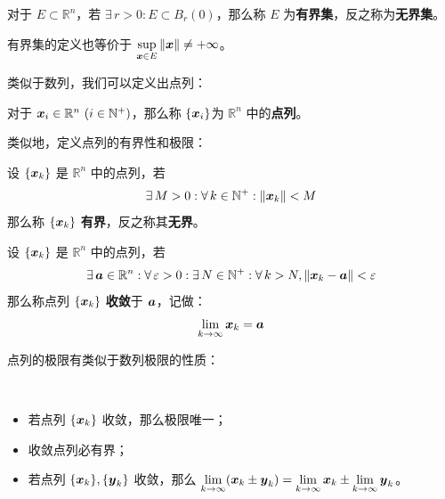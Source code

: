 \begin{definition}
    对于 $E \subset \mathbb{R}^{n}$，若 $\exists\,r > 0: E \subset B_r(0)$，那么称 $E$ 为\textbf{有界集}，反之称为\textbf{无界集}。
\end{definition}

\begin{remark}
    有界集的定义也等价于 $\sup\limits_{\boldsymbol{x} \in E} \norm{\boldsymbol{x}} \neq +\infty$。
\end{remark}

类似于数列，我们可以定义出点列：

\begin{definition}[点列]
    对于 $\boldsymbol{x}_i \in \mathbb{R}^{n} \ (i \in \mathbb{N}^{+})$，那么称 $\{\boldsymbol{x}_i\}$为 $\mathbb{R}^{n}$ 中的\textbf{点列}。
\end{definition}

类似地，定义点列的有界性和极限：

\begin{definition}[点列的有界性]
    设 $\{\boldsymbol{x}_k\}$ 是 $\mathbb{R}^{n}$ 中的点列，若
    $$
    \exists\,M > 0: \forall\,k \in \mathbb{N}^{+}: \norm{\boldsymbol{x}_k} < M
    $$
    那么称 $\{\boldsymbol{x}_k\}$ \textbf{有界}，反之称其\textbf{无界}。
\end{definition}

\begin{definition}[点列的极限]
    设 $\{\boldsymbol{x}_k\}$ 是 $\mathbb{R}^{n}$ 中的点列，若
    $$
    \exists\,\boldsymbol{a} \in \mathbb{R}^{n}: \forall\,\varepsilon > 0: \exists\,N \in \mathbb{N}^{+}: \forall\,k > N, \norm{\boldsymbol{x}_k - \boldsymbol{a}} < \varepsilon
    $$
    那么称点列 $\{\boldsymbol{x}_k\}$ \textbf{收敛}于 $\boldsymbol{a}$，记做：
    $$
    \lim_{k \to \infty} \boldsymbol{x}_k = \boldsymbol{a}
    $$
\end{definition}

点列的极限有类似于数列极限的性质：

\begin{property}
    \ 
    \begin{itemize}
        \item 若点列 $\{\boldsymbol{x}_k\}$ 收敛，那么极限唯一；
        \item 收敛点列必有界；
        \item 若点列 $\{\boldsymbol{x}_k\}, \{\boldsymbol{y}_k\}$ 收敛，那么 $\lim\limits_{k \to \infty} (\boldsymbol{x}_k \pm \boldsymbol{y}_k) = \lim\limits_{k \to \infty} \boldsymbol{x}_k \pm \lim\limits_{k \to \infty} \boldsymbol{y}_k$。
    \end{itemize}
\end{property}

